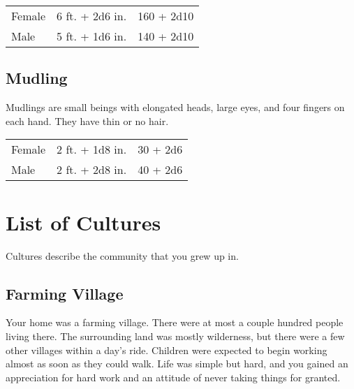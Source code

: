 \begin{multicols}{2}
\begin{center}
{
\begin{xtabular}{|l|l|l|}
Female & 6 ft. + 2d6 in. & 160 + 2d10 \\
Male & 5 ft. + 1d6 in. & 140 + 2d10 \\
\hline
\end{xtabular}
}
\end{center}

\subsection{Mudling}

Mudlings are small beings with elongated heads, large eyes, and four fingers on each hand. They
have thin or no hair.

\begin{center}
{
\begin{xtabular}{|l|l|l|}
Female & 2 ft. + 1d8 in. & 30 + 2d6 \\
Male & 2 ft. + 2d8 in. & 40 + 2d6 \\
\hline
\end{xtabular}
}
\end{center}

\section{List of Cultures}

Cultures describe the community that you grew up in. 

\subsection{Farming Village}

Your home was a farming village. There were at most a couple hundred
people living there. The surrounding land was mostly wilderness, but
there were a few other villages within a day's ride. Children were
expected to begin working almost as soon as they could walk. Life was
simple but hard, and you gained an appreciation for hard work and
an attitude of never taking things for granted.


\end{multicols}
